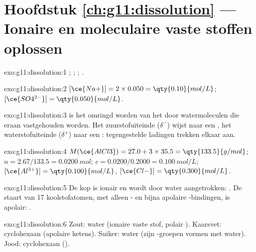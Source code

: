 \section*{Hoofdstuk \ref{ch:g11:dissolution} --- Ionaire en moleculaire vaste stoffen oplossen}

\begin{solution}{exo:g11:dissolution:1}
;
;
;
.
\end{solution}

\begin{solution}{exo:g11:dissolution:2}
$[\ce{Na+}] = 2 \times 0.050 = \qty{0.10}{mol/L}$;
$[\ce{SO4^{2-}}] = \qty{0.050}{mol/L}$.
\end{solution}

\begin{solution}{exo:g11:dissolution:3}
 is het omringd worden van het  door watermoleculen die eraan
vastgehouden worden. Het zuurstofuiteinde ($\delta^-$) wijst naar een
, het waterstofuiteinde ($\delta^+$) naar een : tegengestelde
ladingen trekken elkaar aan.
\end{solution}

\begin{solution}{exo:g11:dissolution:4}
$M(\ce{AlCl3}) = 27.0 + 3 \times 35.5 = \qty{133.5}{g/mol}$;
$n = 2.67 / 133.5 = \qty{0.0200}{mol}$; $c = 0.0200 / 0.2000 =
\qty{0.100}{mol/L}$; $[\ce{Al^{3+}}] = \qty{0.100}{mol/L}$,
$[\ce{Cl-}] = \qty{0.300}{mol/L}$.
\end{solution}

\begin{solution}{exo:g11:dissolution:5}
De kop  is ionair en wordt door water aangetrokken: .
De staart van 17 koolstofatomen, met alleen - en bijna apolaire
-bindingen, is apolair: .
\end{solution}

\begin{solution}{exo:g11:dissolution:6}
Zout: water (ionaire vaste stof, polair ). Kaarsvet:
cyclohexaan (apolaire ketens). Suiker: water (zijn -groepen vormen
 met water). Jood: cyclohexaan ().
\end{solution}

